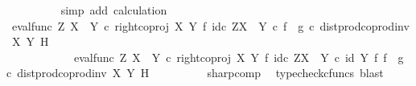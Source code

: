 \begin{isabellebody}
\ \ \ \ \ \ \ \ \isamarkupfalse%
\ {\isacharparenleft}{\kern0pt}simp\ add{\isacharcolon}{\kern0pt}\ calculation{\isacharparenright}{\kern0pt}\isanewline
\ \ \ \ \isamarkupfalse%
\isanewline
\ \ \ \ \ \ \isamarkupfalse%
\ {\isachardoublequoteopen}{\isacharparenleft}{\kern0pt}eval{\isacharunderscore}{\kern0pt}func\ Z\ {\isacharparenleft}{\kern0pt}X\ {\isasymCoprod}\ Y{\isacharparenright}{\kern0pt}\ {\isasymcirc}\isactrlsub c\ right{\isacharunderscore}{\kern0pt}coproj\ X\ Y\ {\isasymtimes}\isactrlsub f\ id\isactrlsub c\ {\isacharparenleft}{\kern0pt}Z\isactrlbsup {\isacharparenleft}{\kern0pt}X\ {\isasymCoprod}\ Y{\isacharparenright}{\kern0pt}\isactrlesup {\isacharparenright}{\kern0pt}{\isacharparenright}{\kern0pt}\isactrlsup {\isasymsharp}\ {\isasymcirc}\isactrlsub c\ {\isacharparenleft}{\kern0pt}f\isactrlsup {\isasymflat}\ {\isasymamalg}\ g\isactrlsup {\isasymflat}\ {\isasymcirc}\isactrlsub c\ dist{\isacharunderscore}{\kern0pt}prod{\isacharunderscore}{\kern0pt}coprod{\isacharunderscore}{\kern0pt}inv{}\ X\ Y\ H{\isacharparenright}{\kern0pt}\isactrlsup {\isasymsharp}\ {\isacharequal}{\kern0pt}\ \isanewline
\ \ \ \ \ \ \ \ \ \ \ \ {\isacharparenleft}{\kern0pt}{\isacharparenleft}{\kern0pt}eval{\isacharunderscore}{\kern0pt}func\ Z\ {\isacharparenleft}{\kern0pt}X\ {\isasymCoprod}\ Y{\isacharparenright}{\kern0pt}\ {\isasymcirc}\isactrlsub c\ right{\isacharunderscore}{\kern0pt}coproj\ X\ Y\ {\isasymtimes}\isactrlsub f\ id\isactrlsub c\ {\isacharparenleft}{\kern0pt}Z\isactrlbsup {\isacharparenleft}{\kern0pt}X\ {\isasymCoprod}\ Y{\isacharparenright}{\kern0pt}\isactrlesup {\isacharparenright}{\kern0pt}{\isacharparenright}{\kern0pt}\ {\isasymcirc}\isactrlsub c\ {\isacharparenleft}{\kern0pt}id\ Y\ {\isasymtimes}\isactrlsub f\ {\isacharparenleft}{\kern0pt}f\isactrlsup {\isasymflat}\ {\isasymamalg}\ g\isactrlsup {\isasymflat}\ {\isasymcirc}\isactrlsub c\ dist{\isacharunderscore}{\kern0pt}prod{\isacharunderscore}{\kern0pt}coprod{\isacharunderscore}{\kern0pt}inv{}\ X\ Y\ H{\isacharparenright}{\kern0pt}\isactrlsup {\isasymsharp}{\isacharparenright}{\kern0pt}{\isacharparenright}{\kern0pt}\isactrlsup {\isasymsharp}{\isachardoublequoteclose}\isanewline
\ \ \ \ \ \ \ \ \isamarkupfalse%
\ sharp{\isacharunderscore}{\kern0pt}comp\ \isamarkupfalse%
\ {\isacharparenleft}{\kern0pt}typecheck{\isacharunderscore}{\kern0pt}cfuncs{\isacharcomma}{\kern0pt}\ blast{\isacharparenright}{\kern0pt}\isanewline
\ \ \ \ \ \ \isamarkupfalse%
\ \isamarkupfalse%

\end{isabellebody}
